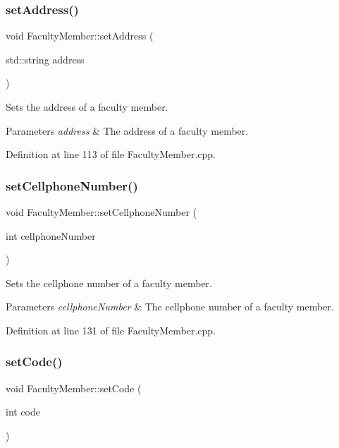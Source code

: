\subsubsection{\texorpdfstring{set\+Address()}{setAddress()}}
{\footnotesize\ttfamily void Faculty\+Member\+::set\+Address (\begin{DoxyParamCaption}\item[{std\+::string}]{address }\end{DoxyParamCaption})}

Sets the address of a faculty member. 
\begin{DoxyParams}{Parameters}
{\em address} & The address of a faculty member. \\
\hline
\end{DoxyParams}


Definition at line 113 of file Faculty\+Member.\+cpp.

\mbox{\label{classFacultyMember_aceb0270b28a96e52cfe138c26f3936a4}} 
\subsubsection{\texorpdfstring{set\+Cellphone\+Number()}{setCellphoneNumber()}}
{\footnotesize\ttfamily void Faculty\+Member\+::set\+Cellphone\+Number (\begin{DoxyParamCaption}\item[{int}]{cellphone\+Number }\end{DoxyParamCaption})}

Sets the cellphone number of a faculty member. 
\begin{DoxyParams}{Parameters}
{\em cellphone\+Number} & The cellphone number of a faculty member. \\
\hline
\end{DoxyParams}


Definition at line 131 of file Faculty\+Member.\+cpp.

\mbox{\label{classFacultyMember_acb54ae36938fc1b96bdb1ae8060c29c1}} 
\subsubsection{\texorpdfstring{set\+Code()}{setCode()}}
{\footnotesize\ttfamily void Faculty\+Member\+::set\+Code (\begin{DoxyParamCaption}\item[{int}]{code }\end{DoxyParamCaption})}


